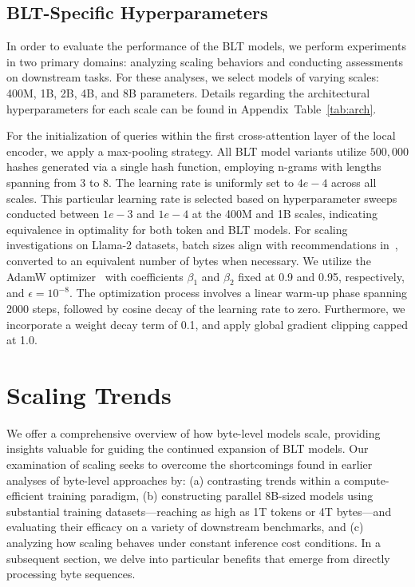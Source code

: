 \subsection{{\textsc BLT}-Specific Hyperparameters} In order to evaluate the performance of the {\textsc BLT} models, we perform experiments in two primary domains: analyzing scaling behaviors and conducting assessments on downstream tasks. For these analyses, we select models of varying scales: 400M, 1B, 2B, 4B, and 8B parameters. Details regarding the architectural hyperparameters for each scale can be found in Appendix~Table~\ref{tab:arch}. 

For the initialization of queries within the first cross-attention layer of the local encoder, we apply a max-pooling strategy. All {\textsc BLT} model variants utilize $500,000$ hashes generated via a single hash function, employing n-grams with lengths spanning from 3 to 8. The learning rate is uniformly set to $4e-4$ across all scales. This particular learning rate is selected based on hyperparameter sweeps conducted between $1e-3$ and $1e-4$ at the 400M and 1B scales, indicating equivalence in optimality for both token and {\textsc BLT} models. For scaling investigations on Llama-2 datasets, batch sizes align with recommendations in~\cite{dubey2024llama}, converted to an equivalent number of bytes when necessary. We utilize the AdamW optimizer~\citep{adamw} with coefficients $\beta_1$ and $\beta_2$ fixed at 0.9 and 0.95, respectively, and $\epsilon=10^{-8}$. The optimization process involves a linear warm-up phase spanning 2000 steps, followed by cosine decay of the learning rate to zero. Furthermore, we incorporate a weight decay term of 0.1, and apply global gradient clipping capped at 1.0.

\section{Scaling Trends}
\label{section:scaling}

We offer a comprehensive overview of how byte-level models scale, providing insights valuable for guiding the continued expansion of {\textsc BLT} models. Our examination of scaling seeks to overcome the shortcomings found in earlier analyses of byte-level approaches by: (a) contrasting trends within a compute-efficient training paradigm, (b) constructing parallel 8B-sized models using substantial training datasets—reaching as high as 1T tokens or 4T bytes—and evaluating their efficacy on a variety of downstream benchmarks, and (c) analyzing how scaling behaves under constant inference cost conditions. In a subsequent section, we delve into particular benefits that emerge from directly processing byte sequences.

